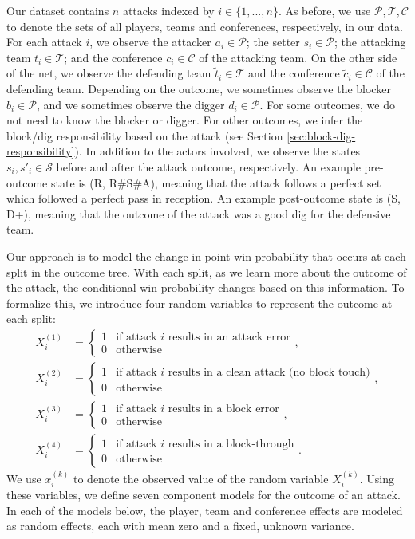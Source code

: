 \documentclass{article}
\begin{document}
Our dataset contains $n$ attacks indexed by $i \in \{1, ..., n\}$. As before, we use $\mathcal{P}, \mathcal{T}, \mathcal{C}$ to denote the sets of all players, teams and conferences, respectively, in our data. For each attack $i$, we observe the attacker $a_i \in \mathcal{P}$; the setter $s_i \in \mathcal{P}$; the attacking team $t_i \in \mathcal{T}$; and the conference $c_i \in \mathcal{C}$ of the attacking team. On the other side of the net, we observe the defending team $\tilde t_i \in \mathcal{T}$ and the conference $\tilde c_i \in \mathcal C$ of the defending team. Depending on the outcome, we sometimes observe the blocker $b_i \in \mathcal{P}$, and we sometimes observe the digger $d_i \in \mathcal{P}$. For some outcomes, we do not need to know the blocker or digger. For other outcomes, we infer the block/dig responsibility based on the attack (see Section \ref{sec:block-dig-responsibility}). In addition to the actors involved, we observe the states $s_i, s'_i \in \mathcal{S}$ before and after the attack outcome, respectively. An example pre-outcome state is (R, R\#S\#A), meaning that the attack follows a perfect set which followed a perfect pass in reception. An example post-outcome state is (S, D+), meaning that the outcome of the attack was a good dig for the defensive team.

Our approach is to model the change in point win probability that occurs at each split in the outcome tree. With each split, as we learn more about the outcome of the attack, the conditional win probability changes based on this information. To formalize this, we introduce four random variables to represent the outcome at each split:
\begin{align*}
    X_i^{(1)} &= \begin{cases}
        1   & \mbox{if attack $i$ results in an attack error}\\
        0   & \mbox{otherwise}
    \end{cases},\\
    X_i^{(2)} &= \begin{cases}
        1   & \mbox{if attack $i$ results in a clean attack (no block touch)}\\
        0   & \mbox{otherwise}
    \end{cases},\\
    X_i^{(3)} &= \begin{cases}
        1   & \mbox{if attack $i$ results in a block error}\\
        0   & \mbox{otherwise}
    \end{cases},\\
    X_i^{(4)} &= \begin{cases}
        1   & \mbox{if attack $i$ results in a block-through}\\
        0   & \mbox{otherwise}
    \end{cases}.
\end{align*}
We use $x_i^{(k)}$ to denote the observed value of the random variable $X_i^{(k)}$. Using these variables, we define seven component models for the outcome of an attack. In each of the models below, the player, team and conference effects are modeled as random effects, each with mean zero and a fixed, unknown variance.\\
\end{document}
